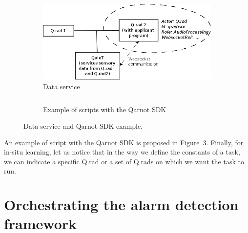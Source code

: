 \documentclass[10pt, conference, compsocconf]{IEEEtran}
\begin{document}
	\begin{figure}[ht]
          \begin{subfigure}[b]{0.4\textwidth}
            \captionsetup{skip=0pt}
            \centering
            \includegraphics[scale=0.25]{./Figures/DataService.png}
            \caption{Data service \label{subfig:qaiot}}
          \end{subfigure}
          \begin{subfigure}[b]{0.6\textwidth}
            \captionsetup{skip=0pt}
            \centering
            \inputminted[baselinestretch=1, bgcolor=LightGray, fontsize=\scriptsize]{python}{sample.py}
            \caption{Example of scripts with the Qarnot SDK \label{subfig:sample}}
          \end{subfigure}
          \caption{Data service and Qarnot SDK example.} 
          \label{fig:arch}
	\end{figure}

An example of script with the Qarnot SDK is proposed in Figure~\ref{fig:arch}. Finally, for in-situ learning, let us notice that 
in the way we define the constants of a task, we can indicate a specific Q.rad or a set of Q.rads on which we want the task to run.

\section{Orchestrating the alarm detection framework} \label{Orchestrator}
\end{document}
